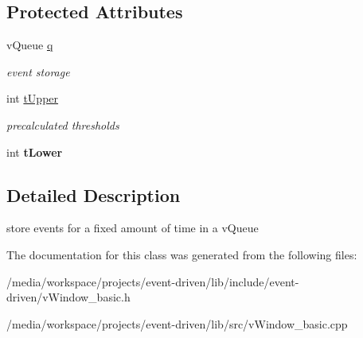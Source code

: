 \subsection*{Protected Attributes}
\begin{DoxyCompactItemize}
\item 
\mbox{\label{classev_1_1vTempWindow_abed022ad51f68443a2350fbeabbb4233}} 
v\+Queue \hyperlink{classev_1_1vTempWindow_abed022ad51f68443a2350fbeabbb4233}{q}
\begin{DoxyCompactList}\small\item\em event storage \end{DoxyCompactList}\item 
\mbox{\label{classev_1_1vTempWindow_a909a8f6df0014d1f318c6209223f5fad}} 
int \hyperlink{classev_1_1vTempWindow_a909a8f6df0014d1f318c6209223f5fad}{t\+Upper}
\begin{DoxyCompactList}\small\item\em precalculated thresholds \end{DoxyCompactList}\item 
\mbox{\label{classev_1_1vTempWindow_a47845a9e47b73598e2a325c06e994bed}} 
int {\bfseries t\+Lower}
\end{DoxyCompactItemize}


\subsection{Detailed Description}
store events for a fixed amount of time in a v\+Queue 

The documentation for this class was generated from the following files\+:\begin{DoxyCompactItemize}
\item 
/media/workspace/projects/event-\/driven/lib/include/event-\/driven/v\+Window\+\_\+basic.\+h\item 
/media/workspace/projects/event-\/driven/lib/src/v\+Window\+\_\+basic.\+cpp\end{DoxyCompactItemize}
